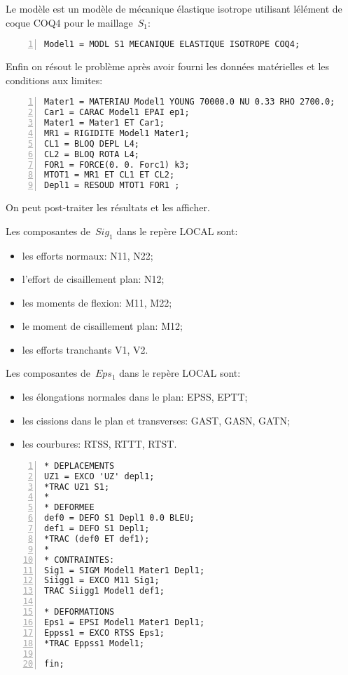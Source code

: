 \medskip
Le modèle est un modèle de mécanique élastique isotrope utilisant lélément de coque COQ4 pour le maillage~$S_1$:

\begin{Verbatim}[numbers=left,numbersep=3pt,firstnumber=last]
Model1 = MODL S1 MECANIQUE ELASTIQUE ISOTROPE COQ4;
\end{Verbatim}

\medskip
Enfin on résout le problème après avoir fourni les données matérielles et les conditions aux limites:

\begin{Verbatim}[numbers=left,numbersep=3pt,firstnumber=last]
Mater1 = MATERIAU Model1 YOUNG 70000.0 NU 0.33 RHO 2700.0;
Car1 = CARAC Model1 EPAI ep1;
Mater1 = Mater1 ET Car1;
MR1 = RIGIDITE Model1 Mater1;
CL1 = BLOQ DEPL L4;
CL2 = BLOQ ROTA L4;
FOR1 = FORCE(0. 0. Forc1) k3;
MTOT1 = MR1 ET CL1 ET CL2;
Depl1 = RESOUD MTOT1 FOR1 ;
\end{Verbatim}

\medskip
On peut post-traiter les résultats et les afficher.

Les composantes de~$Sig_1$ dans le repère LOCAL sont:
\begin{itemize}
  \item les efforts normaux: N11, N22;
  \item l'effort de cisaillement plan: N12; 
  \item les moments de flexion: M11, M22;
  \item le moment de cisaillement plan: M12;
  \item les efforts tranchants V1, V2.
\end{itemize}

Les composantes de~$Eps_1$ dans le repère LOCAL sont:
\begin{itemize}
  \item les élongations normales dans le plan: EPSS, EPTT;
  \item les cissions dans le plan et transverses: GAST, GASN, GATN;
  \item les courbures: RTSS, RTTT, RTST.
\end{itemize}

\begin{Verbatim}[numbers=left,numbersep=3pt,firstnumber=last]
* DEPLACEMENTS
UZ1 = EXCO 'UZ' depl1;
*TRAC UZ1 S1;
*
* DEFORMEE
def0 = DEFO S1 Depl1 0.0 BLEU;
def1 = DEFO S1 Depl1;
*TRAC (def0 ET def1);
*
* CONTRAINTES: 
Sig1 = SIGM Model1 Mater1 Depl1;
Siigg1 = EXCO M11 Sig1;
TRAC Siigg1 Model1 def1;

* DEFORMATIONS
Eps1 = EPSI Model1 Mater1 Depl1;
Eppss1 = EXCO RTSS Eps1;
*TRAC Eppss1 Model1;

fin;
\end{Verbatim}


